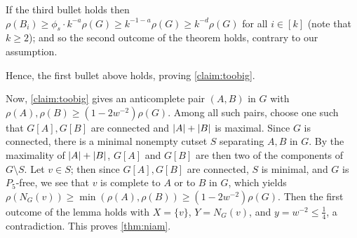 \documentclass[11pt,reqno]{amsart}
\let\oldendproof\endproof
\renewenvironment{proof}[1][\proofname]{%
	\oldproof[\normalfont\bfseries #1]%
}{\oldendproof}
\renewcommand{\qedsymbol}{$\blacksquare$}%
\newenvironment{subproof}[1][\normalfont\it Subproof]{%
	\renewcommand{\qedsymbol}{$\square$}%
	\begin{proof}[#1]%
	}{%
	\end{proof}%
}
\DeclarePairedDelimiter\abs{\lvert}{\rvert}%
\begin{document}
\begin{proof}
\begin{subproof}
			If the third bullet holds then $\rho(B_i)\ge \phi_s\cdot k^{-a}\rho(G)\ge k^{-1-a}\rho(G)\ge k^{-d}\rho(G)$ for all $i\in[k]$ (note that $k\ge 2$); and so the second outcome of the theorem holds, contrary to our assumption.
			
			Hence, the first bullet above holds, proving \cref{claim:toobig}.
		\end{subproof}
		
		Now, \cref{claim:toobig} gives an anticomplete pair $(A,B)$ in $G$ with $\rho(A),\rho(B)\ge (1-2w^{-2})\rho(G)$.
		Among all such pairs, choose one such that $G[A],G[B]$ are connected and $\abs A+\abs B$ is maximal.
		Since $G$ is connected, there is a minimal nonempty cutset $S$ separating $A,B$ in $G$.
		By the maximality of $\abs A+\abs B$, $G[A]$ and $G[B]$ are then two of the components of $G\setminus S$.
		Let $v\in S$; then since $G[A],G[B]$ are connected, $S$ is minimal, and $G$ is $P_5$-free, we see that $v$ is complete to $A$ or to $B$ in $G$, which yields $\rho(N_G(v))\ge\min(\rho(A),\rho(B))\ge(1-2w^{-2})\rho(G)$.
		Then the first outcome of the lemma holds with $X=\{v\}$, $Y=N_G(v)$, and $y=w^{-2}\le\frac14$, a contradiction.
		This proves \cref{thm:niam}.
	\end{proof}
	
	
	
\end{document}
